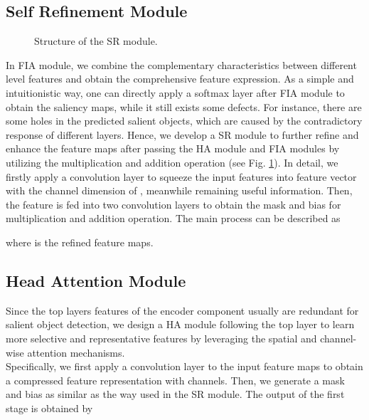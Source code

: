 \documentclass[letterpaper]{article} \usepackage{aaai20}  \usepackage{times}  \usepackage{helvet} \usepackage{courier}  \usepackage[hyphens]{url}  \usepackage{graphicx} \urlstyle{rm} \def\UrlFont{\rm}  \usepackage{graphicx}  \frenchspacing  \setlength{\pdfpagewidth}{8.5in}  \setlength{\pdfpageheight}{11in}
\begin{document}
\subsection{Self Refinement Module}
\begin{figure}[t] 
\centering 
{} 
\caption{Structure of the SR module.}
\label{fig:srm}
\end{figure} 
In FIA module, we combine the complementary characteristics between different level features and obtain the comprehensive feature expression. 
As a simple and intuitionistic way, one can directly apply a softmax layer after FIA module to obtain the saliency maps, while it still exists some defects. For instance, 
there are some holes in the predicted salient objects, which are caused by the contradictory response of different layers. 
Hence, we develop a SR module to further refine and enhance the feature maps after passing the HA module and FIA modules by utilizing the multiplication and addition operation
(see Fig. \ref{fig:srm}).
In detail, we firstly apply a  convolution layer to squeeze the input features 
into feature vector  with the channel dimension of , meanwhile remaining useful information. 
Then, the feature  is fed into two convolution layers to obtain the mask  and bias  for multiplication and addition operation.
The main process can be described as

where  is the refined feature maps.
\subsection{Head Attention Module} 
Since the top layers features of the encoder component usually are redundant for salient object detection, we design a HA module following the top layer to learn more selective and representative features by leveraging the spatial and channel-wise attention mechanisms. \\
\indent Specifically, we first apply a convolution layer to the input feature maps  to 
obtain a compressed feature representation  with  channels. 
Then, we generate a mask  and bias  as similar as the way used in the SR module. 
The output of the first stage is obtained by
\end{document}
